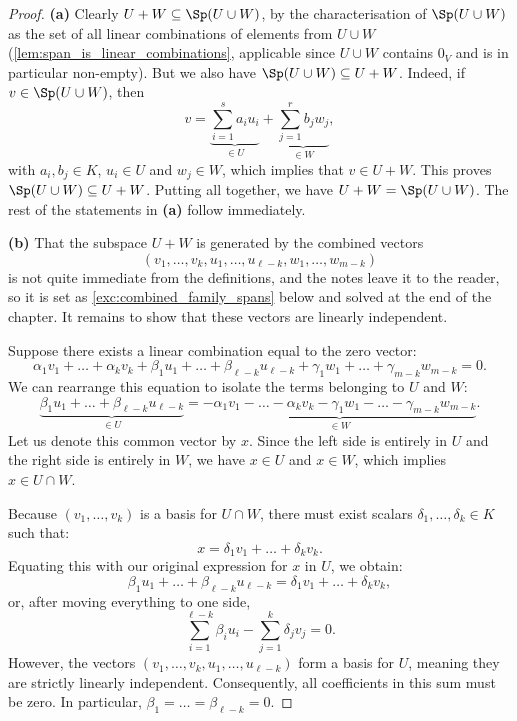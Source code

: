 \begin{proof}
\textbf{(a)} Clearly $U + W \subseteq \Sp(U \cup W)$, by the characterisation of $\Sp(U \cup W)$ as the set of all linear combinations of elements from $U \cup W$ (\cref{lem:span_is_linear_combinations}, applicable since $U \cup W$ contains $0_V$ and is in particular non-empty). But we also have $\Sp(U \cup W) \subseteq U + W$. Indeed, if $v \in \Sp(U \cup W)$, then
\[
v = \underbrace{\sum_{i=1}^{s} a_i u_i}_{\in U} + \underbrace{\sum_{j=1}^{r} b_j w_j}_{\in W},
\]
with $a_i, b_j \in K$, $u_i \in U$ and $w_j \in W$, which implies that $v \in U + W$. This proves $\Sp(U \cup W) \subseteq U + W$. Putting all together, we have $U + W = \Sp(U \cup W)$. The rest of the statements in \textbf{(a)} follow immediately.

\textbf{(b)} That the subspace $U + W$ is generated by the combined vectors
\[
(v_1, \dots, v_k, u_1, \dots, u_{\ell-k}, w_1, \dots, w_{m-k})
\]
is not quite immediate from the definitions, and the notes leave it to the reader, so it is set as \cref{exc:combined_family_spans} below and solved at the end of the chapter. It remains to show that these vectors are linearly independent.

Suppose there exists a linear combination equal to the zero vector:
\begin{equation}
\label{eq:linear_comb_sum}
\alpha_1 v_1 + \dots + \alpha_k v_k + \beta_1 u_1 + \dots + \beta_{\ell-k} u_{\ell-k} + \gamma_1 w_1 + \dots + \gamma_{m-k} w_{m-k} = 0.
\end{equation}
We can rearrange this equation to isolate the terms belonging to $U$ and $W$:
\[
\underbrace{\beta_1 u_1 + \dots + \beta_{\ell-k} u_{\ell-k}}_{\in U} = \underbrace{-\alpha_1 v_1 - \dots - \alpha_k v_k - \gamma_1 w_1 - \dots - \gamma_{m-k} w_{m-k}}_{\in W}.
\]
Let us denote this common vector by $x$. Since the left side is entirely in $U$ and the right side is entirely in $W$, we have $x \in U$ and $x \in W$, which implies $x \in U \cap W$. 

Because $(v_1, \dots, v_k)$ is a basis for $U \cap W$, there must exist scalars $\delta_1, \dots, \delta_k \in K$ such that:
\[
x = \delta_1 v_1 + \dots + \delta_k v_k.
\]
Equating this with our original expression for $x$ in $U$, we obtain:
\[
\beta_1 u_1 + \dots + \beta_{\ell-k} u_{\ell-k} = \delta_1 v_1 + \dots + \delta_k v_k,
\]
or, after moving everything to one side,
\[
\sum_{i=1}^{\ell-k} \beta_i u_i - \sum_{j=1}^k \delta_j v_j = 0.
\]
However, the vectors $(v_1, \dots, v_k, u_1, \dots, u_{\ell-k})$ form a basis for $U$, meaning they are strictly linearly independent. Consequently, all coefficients in this sum must be zero. In particular, $\beta_1 = \dots = \beta_{\ell-k} = 0$.


\end{proof}

